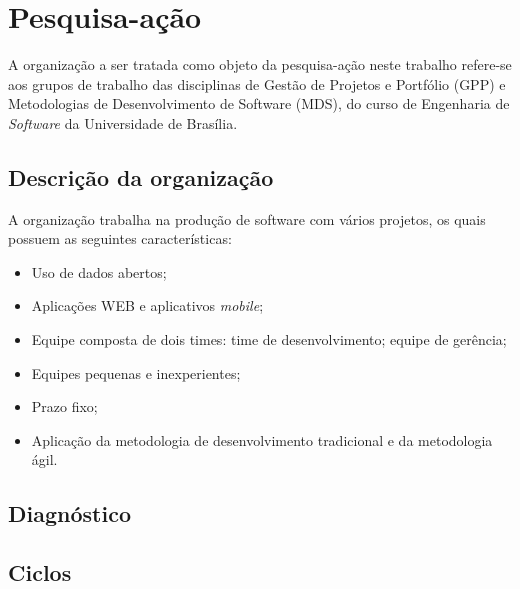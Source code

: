 \chapter{Pesquisa-ação}
\label{pesquisa_acao}

	A organização a ser tratada como objeto da pesquisa-ação neste trabalho refere-se aos grupos de trabalho das disciplinas de Gestão de Projetos
	e Portfólio (GPP) e Metodologias de Desenvolvimento de Software (MDS), do curso de Engenharia de \textit{Software}
	da Universidade de Brasília.

	\section{Descrição da organização}
	\label{organizacao}
		A organização trabalha na produção de software com vários projetos, os quais possuem as seguintes características:

		\begin{itemize}
			\item Uso de dados abertos;
			\item Aplicações WEB e aplicativos \textit{mobile};
			\item Equipe composta de dois times:
				 time de desenvolvimento;
				 equipe de gerência;
			\item Equipes pequenas e inexperientes;
			\item Prazo fixo;
			\item Aplicação da metodologia de desenvolvimento tradicional e da metodologia ágil.
		\end{itemize}

	\section{Diagnóstico}
	\label{diagnostico}
	
	

	\section{Ciclos}

	




